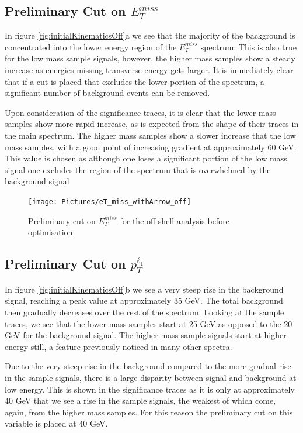 \subsection{Preliminary Cut on $E_{T}^{miss}$}
In figure \ref{fig:initialKinematicsOff}a we see that the majority of the background is concentrated into the lower energy region of the $E_{T}^{miss}$ spectrum. 
This is also true for the low mass sample signals, however, the higher mass samples show a steady increase as energies missing transverse energy gets larger.
It is immediately clear that if a cut is placed that excludes the lower portion of the spectrum, a significant number of background events can be removed.

Upon consideration of the significance traces, it is clear that the lower mass samples show more rapid increase, as is expected from the shape of their traces in the main spectrum.
The higher mass samples show a slower increase that the low mass samples, with a good point of increasing gradient at approximately 60 GeV.
This value is chosen as although one loses a significant portion of the low mass signal one excludes the region of the spectrum that is overwhelmed by the background signal

\begin{figure}[H] %
   \centering
   \texttt{[image: Pictures/eT\_miss\_withArrow\_off]} 
   \caption{Preliminary cut on $E_{T}^{miss}$ for the off shell analysis before optimisation}
   \label{fig:example}
\end{figure}

\subsection{Preliminary Cut on $p_{T}^{\ell_{1}}$}
In figure \ref{fig:initialKinematicsOff}b we see a very steep rise in the background signal, reaching a peak value at approximately 35 GeV.
The total background then gradually decreases over the rest of the spectrum.
Looking at the sample traces, we see that the lower mass samples start at 25 GeV as opposed to the 20 GeV for the background signal.
The higher mass sample signals start at higher energy still, a feature previously noticed in many other spectra. 

Due to the very steep rise in the background compared to the more gradual rise in the sample signals, there is a large disparity between signal and background at low energy.
This is shown in the significance traces as it is only at approximately 40 GeV that we see a rise in the sample signals, the weakest of which come, again, from the higher mass samples.
For this reason the preliminary cut on this variable is placed at 40 GeV.

